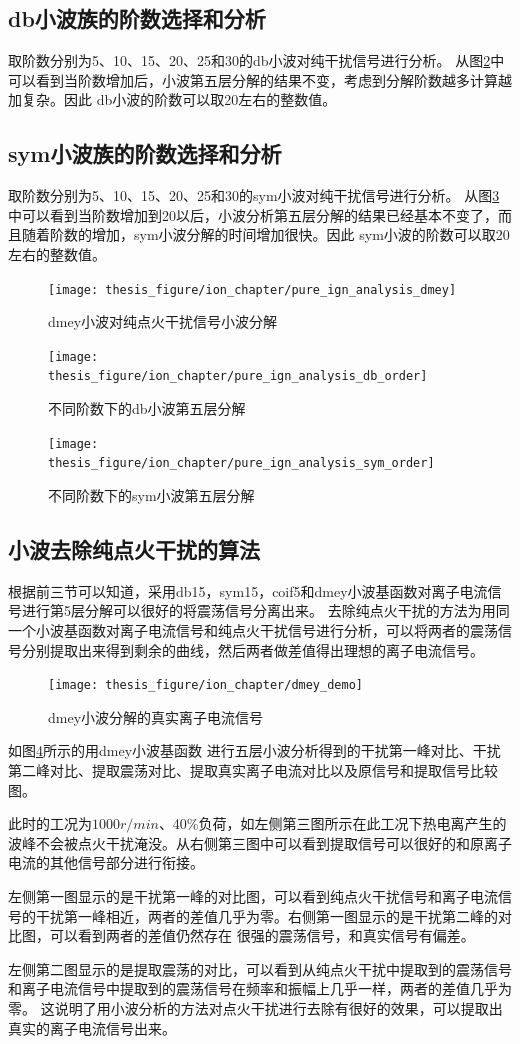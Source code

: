 \subsection{db小波族的阶数选择和分析} 
取阶数分别为5、10、15、20、25和30的db小波对纯干扰信号进行分析。
从图\ref{fig:dbvar}中可以看到当阶数增加后，小波第五层分解的结果不变，考虑到分解阶数越多计算越加复杂。因此
db小波的阶数可以取20左右的整数值。
\subsection{sym小波族的阶数选择和分析} 
取阶数分别为5、10、15、20、25和30的sym小波对纯干扰信号进行分析。
从图\ref{fig:symvar}中可以看到当阶数增加到20以后，小波分析第五层分解的结果已经基本不变了，而且随着阶数的增加，sym小波分解的时间增加很快。因此
sym小波的阶数可以取20左右的整数值。
\begin{figure}[H]
	\texttt{[image: thesis\_figure/ion\_chapter/pure\_ign\_analysis\_dmey]}
	\caption{\label{fig:pure_ign_analysis_dmey}dmey小波对纯点火干扰信号小波分解}
\end{figure}
\begin{figure}[H]
	\centering
	\texttt{[image: thesis\_figure/ion\_chapter/pure\_ign\_analysis\_db\_order]}
	\caption{\label{fig:dbvar}不同阶数下的db小波第五层分解}
\end{figure}
\begin{figure}[H]
	\centering
	\texttt{[image: thesis\_figure/ion\_chapter/pure\_ign\_analysis\_sym\_order]}
	\caption{\label{fig:symvar}不同阶数下的sym小波第五层分解}
\end{figure}
\subsection{小波去除纯点火干扰的算法}
根据前三节可以知道，采用db15，sym15，coif5和dmey小波基函数对离子电流信号进行第5层分解可以很好的将震荡信号分离出来。
去除纯点火干扰的方法为用同一个小波基函数对离子电流信号和纯点火干扰信号进行分析，可以将两者的震荡信号分别提取出来得到剩余的曲线，然后两者做差值得出理想的离子电流信号。\par
\begin{figure}[H]
	\centering
	\texttt{[image: thesis\_figure/ion\_chapter/dmey\_demo]}
	\caption{\label{fig:dmey_realIon}dmey小波分解的真实离子电流信号}
\end{figure}
如图\ref{fig:dmey_realIon}所示的用dmey小波基函数
进行五层小波分析得到的干扰第一峰对比、干扰第二峰对比、提取震荡对比、提取真实离子电流对比以及原信号和提取信号比较图。\par
此时的工况为$1000r/min$、40\%负荷，如左侧第三图所示在此工况下热电离产生的波峰不会被点火干扰淹没。从右侧第三图中可以看到提取信号可以很好的和原离子电流的其他信号部分进行衔接。\par
左侧第一图显示的是干扰第一峰的对比图，可以看到纯点火干扰信号和离子电流信号的干扰第一峰相近，两者的差值几乎为零。右侧第一图显示的是干扰第二峰的对比图，可以看到两者的差值仍然存在
很强的震荡信号，和真实信号有偏差。\par
左侧第二图显示的是提取震荡的对比，可以看到从纯点火干扰中提取到的震荡信号和离子电流信号中提取到的震荡信号在频率和振幅上几乎一样，两者的差值几乎为零。
这说明了用小波分析的方法对点火干扰进行去除有很好的效果，可以提取出真实的离子电流信号出来。
